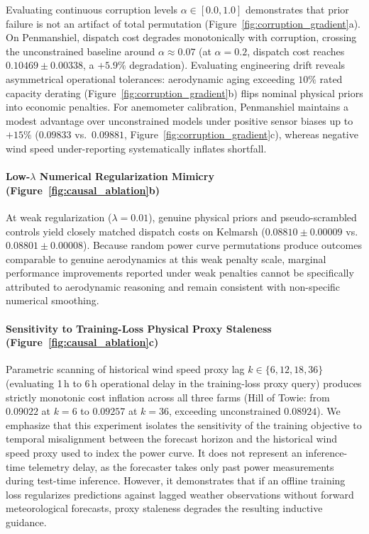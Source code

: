 

Evaluating continuous corruption levels $\alpha \in [0.0, 1.0]$ demonstrates that prior failure is not an artifact of total permutation (Figure~\ref{fig:corruption_gradient}a). On Penmanshiel, dispatch cost degrades monotonically with corruption, crossing the unconstrained baseline around $\alpha \approx 0.07$ (at $\alpha=0.2$, dispatch cost reaches $0.10469 \pm 0.00338$, a $+5.9\%$ degradation). Evaluating engineering drift reveals asymmetrical operational tolerances: aerodynamic aging exceeding $10\%$ rated capacity derating (Figure~\ref{fig:corruption_gradient}b) flips nominal physical priors into economic penalties. For anemometer calibration, Penmanshiel maintains a modest advantage over unconstrained models under positive sensor biases up to $+15\%$ ($0.09833$ vs.\ $0.09881$, Figure~\ref{fig:corruption_gradient}c), whereas negative wind speed under-reporting systematically inflates shortfall.

\paragraph{Low-$\lambda$ Numerical Regularization Mimicry (Figure~\ref{fig:causal_ablation}b)}
At weak regularization ($\lambda = 0.01$), genuine physical priors and pseudo-scrambled controls yield closely matched dispatch costs on Kelmarsh ($0.08810 \pm 0.00009$ vs.\ $0.08801 \pm 0.00008$). Because random power curve permutations produce outcomes comparable to genuine aerodynamics at this weak penalty scale, marginal performance improvements reported under weak penalties cannot be specifically attributed to aerodynamic reasoning and remain consistent with non-specific numerical smoothing.

\paragraph{Sensitivity to Training-Loss Physical Proxy Staleness (Figure~\ref{fig:causal_ablation}c)}
Parametric scanning of historical wind speed proxy lag $k \in \{6, 12, 18, 36\}$ (evaluating 1\,h to 6\,h operational delay in the training-loss proxy query) produces strictly monotonic cost inflation across all three farms (Hill of Towie: from $0.09022$ at $k=6$ to $0.09257$ at $k=36$, exceeding unconstrained $0.08924$). We emphasize that this experiment isolates the sensitivity of the training objective to temporal misalignment between the forecast horizon and the historical wind speed proxy used to index the power curve. It does not represent an inference-time telemetry delay, as the forecaster takes only past power measurements during test-time inference. However, it demonstrates that if an offline training loss regularizes predictions against lagged weather observations without forward meteorological forecasts, proxy staleness degrades the resulting inductive guidance.

